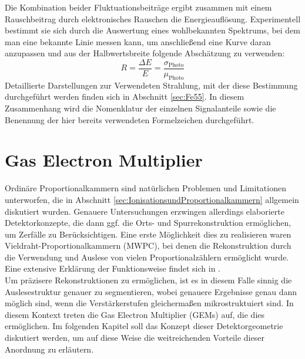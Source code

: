 			Die Kombination beider Fluktuationsbeiträge ergibt zusammen mit einem Rauschbeitrag durch elektronisches Rauschen die Energieauflösung. Experimentell bestimmt sie sich durch die Auswertung eines wohlbekannten Spektrums, bei dem man eine bekannte Linie messen kann, um anschließend eine Kurve daran anzupassen und aus der Halbwertsbreite folgende Abschätzung zu verwenden:
				\begin{equation*}
					R=\frac{\Delta E}{E}= \frac{\sigma_{{\text{Photo}}}}{\mu_{\text{Photo}}}
				\end{equation*}
			Detaillierte Darstellungen zur Verwendeten Strahlung, mit der diese Bestimmung durchgeführt werden finden sich in Abschnitt  \ref{sec:Fe55}. In diesem Zusammenhang wird die Nomenklatur der einzelnen Signalanteile sowie die Benennung der hier bereits verwendeten Formelzeichen durchgeführt.
			
			

\chapter{Gas Electron Multiplier}
Ordinäre Proportionalkammern sind natürlichen Problemen und Limitationen unterworfen, die in Abschnitt \ref{sec:IonisationsundProportionalkammern} allgemein diskutiert wurden. Genauere Untersuchungen erzwingen allerdings elaborierte Detektorkonzepte, die dann ggf. die Orts- und Spurrekonstruktion ermöglichen, um Zerfälle zu Berücksichtigen. Eine erste Möglichkeit dies zu realisieren waren Vieldraht-Proportionalkammern (MWPC), bei denen die Rekonstruktion durch die Verwendung und Auslese von vielen Proportionalzählern ermöglicht wurde. Eine extensive Erklärung der Funktionsweise findet sich in \cite{Sauli_Multiwire}.\\
Um präzisere Rekonstruktionen zu ermöglichen, ist es in diesem Falle sinnig die Auslesestruktur genauer zu segmentieren, wobei genauere Ergebnisse genau dann möglich sind, wenn die Verstärkerstufen gleichermaßen mikrostruktuiert sind. In diesem Kontext treten die Gas Electron Multiplier (GEMs) auf, die dies ermöglichen. Im folgenden Kapitel soll das Konzept dieser Detektorgeometrie diskutiert werden, um auf diese Weise die weitreichenden Vorteile dieser Anordnung zu erläutern.

